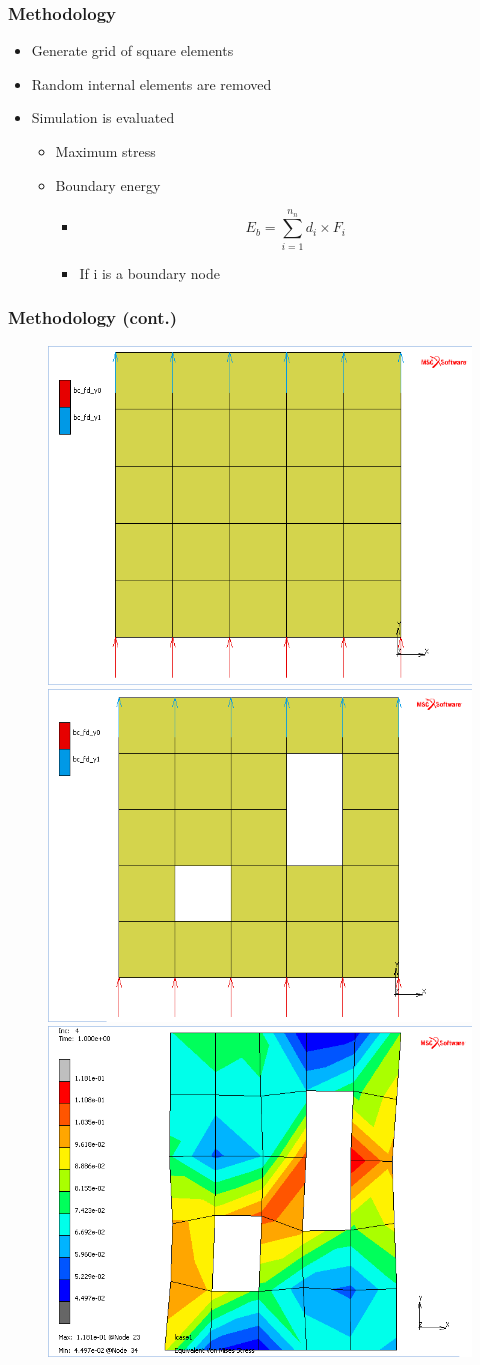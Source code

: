 \documentclass[serif, pdf]{beamer}
\begin{document}
\begin{frame}
    \frametitle{Methodology}
    \begin{itemize}
        \item<1-> Generate grid of square elements
        \item<2-> Random internal elements are removed
        \item<3-> Simulation is evaluated
        \begin{itemize}
            \item<4-> Maximum stress
            \item<5-> Boundary energy
            \begin{itemize}
            	\item<6-> \begin{equation*}
            	E_{b}=\sum_{i=1}^{n_{n}}d_{i}\times F_{i}
            	\end{equation*}
            	\item<6-> If i is a boundary node
            \end{itemize}
        \end{itemize}
    \end{itemize}
\end{frame}


\begin{frame}
    \frametitle{Methodology (cont.)}
    \begin{figure}[h]       
    	\mbox{\includegraphics[width=0.3\linewidth]{Example-Template.png}}   
    	\hspace{3px}
    	\mbox{\includegraphics[width=0.3\linewidth]{Example-Model.png}}
    	\hspace{3px}
    	\mbox{\includegraphics[width=0.3\linewidth]{Example-Model-Results.png}}
	\end{figure}
\end{frame}
\end{document}

